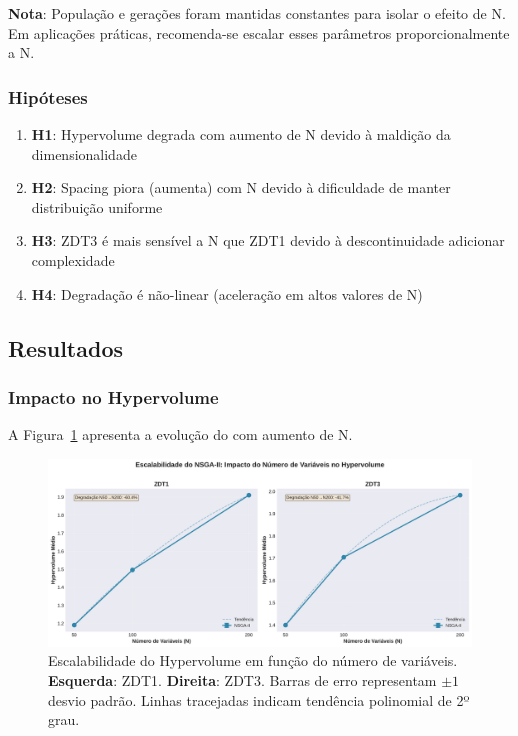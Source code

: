 \textbf{Nota}: População e gerações foram mantidas constantes para isolar o efeito de N. Em aplicações práticas, recomenda-se escalar esses parâmetros proporcionalmente a N.

\subsubsection{Hipóteses}

\begin{enumerate}
    \item \textbf{H1}: Hypervolume degrada com aumento de N devido à maldição da dimensionalidade
    \item \textbf{H2}: Spacing piora (aumenta) com N devido à dificuldade de manter distribuição uniforme
    \item \textbf{H3}: ZDT3 é mais sensível a N que ZDT1 devido à descontinuidade adicionar complexidade
    \item \textbf{H4}: Degradação é não-linear (aceleração em altos valores de N)
\end{enumerate}

\subsection{Resultados}

\subsubsection{Impacto no Hypervolume}

A Figura~\ref{fig:hv_nvar_scaling} apresenta a evolução do \hlv{} com aumento de N.

\begin{figure}[H]
    \centering
    \includegraphics[width=\textwidth]{../plots/I_hypervolume_nvar_scaling.pdf}
    \caption{Escalabilidade do Hypervolume em função do número de variáveis. \textbf{Esquerda}: ZDT1. \textbf{Direita}: ZDT3. Barras de erro representam $\pm1$ desvio padrão. Linhas tracejadas indicam tendência polinomial de 2º grau.}
    \label{fig:hv_nvar_scaling}
\end{figure}

